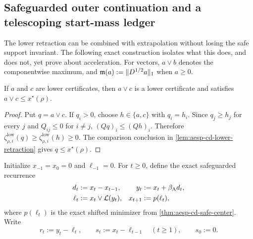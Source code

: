 \subsection{Safeguarded outer continuation and a telescoping start-mass ledger}

The lower retraction can be combined with extrapolation without losing the
safe support invariant.  The following exact construction isolates what this
does, and does not, yet prove about acceleration.  For vectors, $a\vee b$
denotes the componentwise maximum, and
$\mathfrak m(a):=\lVert D^{1/2}a\rVert_1$ when $a\geq0$.

\begin{lemma}
\label{lem:aesp-cd-lower-max}
If $a$ and $c$ are lower certificates, then $a\vee c$ is a lower
certificate and satisfies $a\vee c\leq x^\star(\rho)$.
\end{lemma}

\begin{proof}
Put $q=a\vee c$.  If $q_i>0$, choose $h\in\{a,c\}$ with $q_i=h_i$.
Since $q_j\geq h_j$ for every $j$ and $Q_{ij}\leq0$ for $i\neq j$,
$(Qq)_i\leq(Qh)_i$.  Therefore
$\zeta_{\rho,i}^{\mathrm{low}}(q)\geq
\zeta_{\rho,i}^{\mathrm{low}}(h)\geq0$.  The comparison conclusion in
\cref{lem:aesp-cd-lower-retraction} gives $q\leq x^\star(\rho)$.
\end{proof}

Initialize $x_{-1}=x_0=0$ and $\ell_{-1}=0$.  For $t\geq0$, define the
exact safeguarded recurrence
\begin{align}
 d_t&:=x_t-x_{t-1},
 &y_t&:=x_t+\beta_{\mathrm A}d_t,\notag\\
 \ell_t&:=x_t\vee\mathcal L(y_t),
 &x_{t+1}&:=p(\ell_t),
 \label{eq:aesp-cd-safe-outer}
\end{align}
where $p(\ell_t)$ is the exact shifted minimizer from
\cref{thm:aesp-cd-safe-center}.  Write
\begin{equation}
 r_t:=y_t-\ell_t,
 \qquad
 s_t:=x_t-\ell_{t-1} \quad(t\geq1),
 \qquad s_0:=0.
 \label{eq:aesp-cd-safe-defects}
\end{equation}

